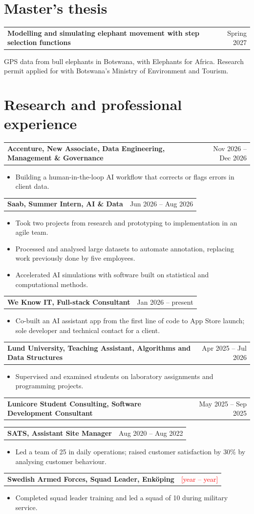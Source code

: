 \documentclass[11pt,a4paper]{article}
\makeatletter
\newcommand{\fixme}[1]{\textcolor{red}{[#1]}}
\newcommand{\cvitem}[2]{\par\needspace{3\baselineskip}\noindent
  \begin{tabularx}{\textwidth}{@{}>{\raggedright\arraybackslash}X@{\hspace{1em}}r@{}}\textbf{#1} & #2\end{tabularx}\par\nopagebreak}
\makeatother
\begin{document}
\section{Master's thesis}
\cvitem{Modelling and simulating elephant movement with step selection functions}{Spring 2027}
GPS data from bull elephants in Botswana, with Elephants for Africa. Research permit applied for with Botswana's Ministry of Environment and Tourism.

\section{Research and professional experience}
\cvitem{Accenture, New Associate, Data Engineering, Management \& Governance}{Nov 2026 -- Dec 2026}
\begin{itemize}
  \item Building a human-in-the-loop AI workflow that corrects or flags errors in client data.
\end{itemize}
\cvitem{Saab, Summer Intern, AI \& Data}{Jun 2026 -- Aug 2026}
\begin{itemize}
  \item Took two projects from research and prototyping to implementation in an agile team.
  \item Processed and analysed large datasets to automate annotation, replacing work previously done by five employees.
  \item Accelerated AI simulations with software built on statistical and computational methods.
\end{itemize}
\cvitem{We Know IT, Full-stack Consultant}{Jan 2026 -- present}
\begin{itemize}
  \item Co-built an AI assistant app from the first line of code to App Store launch; sole developer and technical contact for a client.
\end{itemize}
\cvitem{Lund University, Teaching Assistant, Algorithms and Data Structures}{Apr 2025 -- Jul 2026}
\begin{itemize}
  \item Supervised and examined students on laboratory assignments and programming projects.
\end{itemize}
\cvitem{Lunicore Student Consulting, Software Development Consultant}{May 2025 -- Sep 2025}
\cvitem{SATS, Assistant Site Manager}{Aug 2020 -- Aug 2022}
\begin{itemize}
  \item Led a team of 25 in daily operations; raised customer satisfaction by 30\% by analysing customer behaviour.
\end{itemize}
\cvitem{Swedish Armed Forces, Squad Leader, Enköping}{\fixme{year -- year}}
\begin{itemize}
  \item Completed squad leader training and led a squad of 10 during military service.
\end{itemize}
\end{document}

